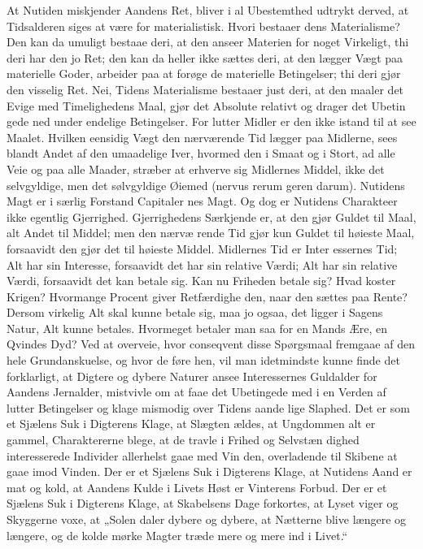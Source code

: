\documentclass[12pt]{book}
\newcommand{\opage}[1]{\marginnote{\footnotesize\textit{[#1]}}}
\begin{document}
At Nutiden miskjender Aandens Ret, bliver i al
Ubestemthed udtrykt derved, at Tidsalderen siges at
være for materialistisk. Hvori bestaaer dens Materialisme?
Den kan da umuligt bestaae deri, at den anseer Materien
for noget Virkeligt, thi deri har den jo Ret; den kan da
heller ikke sættes deri, at den lægger Vægt paa materielle
Goder, arbeider paa at forøge de materielle Betingelser; thi
deri gjør den visselig Ret. Nei, Tidens Materialisme bestaaer
\opage{5}\setcounter{footnote}{0}%
just deri, at den maaler det Evige med Timelighedens
Maal, gjør det Absolute relativt og drager det Ubetin\-%
gede ned under endelige Betingelser. For lutter Midler
er den ikke istand til at see Maalet. Hvilken eensidig
Vægt den nærværende Tid lægger paa Midlerne, sees
blandt Andet af den umaadelige Iver, hvormed den i
Smaat og i Stort, ad alle Veie og paa alle Maader, stræber
at erhverve sig Midlernes Middel, ikke det selvgyldige,
men det sølvgyldige Øiemed (nervus rerum geren\-%
darum). Nutidens Magt er i særlig Forstand Capitaler\-%
nes Magt. Og dog er Nutidens Charakteer ikke egentlig
Gjerrighed. Gjerrighedens Særkjende er, at den gjør
Guldet til Maal, alt Andet til Middel; men den nærvæ\-%
rende Tid gjør kun Guldet til høieste Maal, forsaavidt
den gjør det til høieste Middel. Midlernes Tid er Inter\-%
essernes Tid; Alt har sin Interesse, forsaavidt det har
sin relative Værdi; Alt har sin relative Værdi, forsaavidt
det kan betale sig. Kan nu Friheden betale sig? Hvad
koster Krigen? Hvormange Procent giver Retfærdighe\-%
den, naar den sættes paa Rente? Dersom virkelig Alt
skal kunne betale sig, maa jo ogsaa, det ligger i Sagens
Natur, Alt kunne betales. Hvormeget betaler man saa
for en Mands Ære, en Qvindes Dyd? Ved at overveie,
hvor conseqvent disse Spørgsmaal fremgaae af den hele
Grundanskuelse, og hvor de føre hen, vil man idetmindste
kunne finde det forklarligt, at Digtere og dybere Naturer
ansee Interessernes Guldalder for Aandens Jernalder,
mistvivle om at faae det Ubetingede med i en Verden af
lutter Betingelser og klage mismodig over Tidens aande\-%
lige Slaphed. Det er som et Sjælens Suk i Digterens
Klage, at Slægten ældes, at Ungdommen alt er gammel,
Charaktererne blege, at de travle i Frihed og Selvstæn\-%
dighed interesserede Individer allerhelst gaae med Vin\-%
den, overladende til Skibene at gaae imod Vinden. Der
\opage{6}\setcounter{footnote}{0}%
er et Sjælens Suk i Digterens Klage, at Nutidens Aand
er mat og kold, at Aandens Kulde i Livets Høst er
Vinterens Forbud. Der er et Sjælens Suk i Digterens
Klage, at Skabelsens Dage forkortes, at Lyset viger og
Skyggerne voxe, at „Solen daler dybere og dybere, at
Nætterne blive længere og længere, og de kolde mørke
Magter træde mere og mere ind i Livet.“
\end{document}

